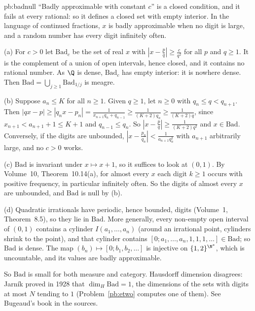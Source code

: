 \begin{solution}{pb:badnull}
\idea ``Badly approximable with constant $c$'' is a closed condition, and it fails at every rational: so it defines a closed set with empty interior.
In the language of continued fractions, $x$ is badly approximable when no digit is large, and a random number has every digit infinitely often.

\writeup (a) For $c>0$ let $\mathrm{Bad}_c$ be the set of real $x$ with $|x-\frac pq|\ge\frac c{q^2}$ for all $p$ and $q\ge1$. It is the complement of a union of
open intervals, hence closed, and it contains no rational number. As $\Q$ is dense, $\mathrm{Bad}_c$ has empty interior: it is nowhere dense. Then
$\mathrm{Bad}=\bigcup_{j\ge1}\mathrm{Bad}_{1/j}$ is meagre.

(b) Suppose $a_n\le K$ for all $n\ge1$. Given $q\ge1$, let $n\ge0$ with $q_n\le q<q_{n+1}$. Then $|qx-p|\ge|q_nx-p_n|=\frac1{x_{n+1}q_n+q_{n-1}}\ge\frac1{(K+2)q_n}\ge\frac1{(K+2)q}$,
since $x_{n+1}<a_{n+1}+1\le K+1$ and $q_{n-1}\le q_n$. So $|x-\frac pq|\ge\frac1{(K+2)q^2}$ and $x\in\mathrm{Bad}$. Conversely, if the digits are unbounded,
$|x-\frac{p_n}{q_n}|<\frac1{a_{n+1}q_n^2}$ with $a_{n+1}$ arbitrarily large, and no $c>0$ works.

(c) $\mathrm{Bad}$ is invariant under $x\mapsto x+1$, so it suffices to look at $(0,1)$. By Volume~10, Theorem~10.14(a), for almost every $x$ each digit
$k\ge1$ occurs with positive frequency, in particular infinitely often. So the digits of almost every $x$ are unbounded, and $\mathrm{Bad}$ is null by (b).

(d) Quadratic irrationals have periodic, hence bounded, digits (Volume~1, Theorem~8.5), so they lie in $\mathrm{Bad}$. More generally, every non-empty open interval of
$(0,1)$ contains a cylinder $I(a_1,\dots,a_n)$ (around an irrational point, cylinders shrink to the point), and that cylinder contains
$[0;a_1,\dots,a_n,1,1,1,\dots]\in\mathrm{Bad}$; so $\mathrm{Bad}$ is dense. The map $(b_n)\mapsto[0;b_1,b_2,\dots]$ is injective on $\{1,2\}^{\N^*}$, which is
uncountable, and its values are badly approximable.

\leads So $\mathrm{Bad}$ is small for both measure and category. Hausdorff dimension disagrees: Jarník proved in 1928 that $\dim_H\mathrm{Bad}=1$, the
dimensions of the sets with digits at most $N$ tending to $1$ (Problem~\ref{pb:etwo} computes one of them). See Bugeaud's book in the sources.
\end{solution}

